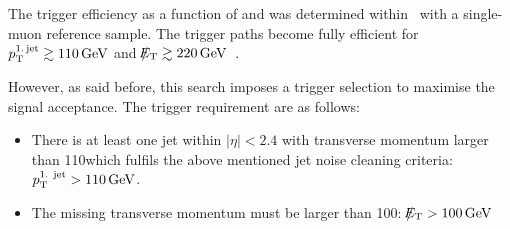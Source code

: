 The trigger efficiency as a function of \met and \ptfirstjet was determined within~\cite{bib:CMS:DM_8TeV} with a single-muon reference sample.
The trigger paths become fully efficient for \mbox{$p_{\text{T}}^{\text{1.\,jet}} \gtrsim 110\,\text{Ge}\kern-0.06667em\text{V}$} and \mbox{$\slash\mkern-12mu{E}_{\text{T}} \gtrsim 220\,\text{Ge}\kern-0.06667em\text{V}$~\cite{bib:CMS:DM_8TeV_AN}}.

However, as said before, this search imposes a trigger selection to maximise the signal acceptance.
The trigger requirement are as follows:
\begin{itemize}
\renewcommand{\labelitemi}{\footnotesize{\ding{118}}}
\item There is at least one jet within $|\eta|<2.4$ with transverse momentum larger than 110\gev which fulfils the above mentioned jet noise cleaning criteria: \mbox{$p_{\text{T}}^{\text{1. jet}}>110\,\text{Ge}\kern-0.06667em\text{V}$}.
\item The missing transverse momentum must be larger than 100\gev: \mbox{$\slash\mkern-12mu{E}_{\text{T}}>100\,\text{Ge}\kern-0.06667em\text{V}$}
\end{itemize}

\hspace{0.9cm}

